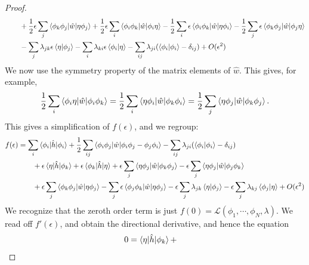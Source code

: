 \documentclass{report}
\theoremstyle{plain}
\theoremstyle{definition}
\begin{document}
\begin{proof}
\begin{equation}
\begin{split}
      & \qquad + \frac{1}{2}\epsilon
      \sum_j\braket{\phi_k\phi_j|\hat{w}|\eta\phi_j} +
      \frac{1}{2}\epsilon\sum_i
      \braket{\phi_i\phi_k|\hat{w}|\phi_i\eta} 
      - \frac{1}{2}\sum_i\epsilon\braket{\phi_i
        \phi_k|\hat{w}|\eta\phi_i}
      - \frac{1}{2}\sum_j\epsilon\braket{\phi_k
        \phi_j|\hat{w}|\phi_j\eta} \\
      & \qquad - \sum_j \lambda_{jk} \epsilon \braket{\eta|\phi_j} -
      \sum_i \lambda_{ki} \epsilon \braket{\phi_i|\eta} -
      \sum_{ij}\lambda_{ji}(\braket{\phi_i|\phi_i} - \delta_{ij}) + O(\epsilon^2)
    \end{split}
  \end{equation}
  We now use the symmetry property of the matrix elements of
  $\hat{w}$. This gives, for example,
  \begin{equation}
     \frac{1}{2} \sum_i
    \braket{\phi_i \eta|\hat{w}|\phi_i \phi_k} = 
    \frac{1}{2} \sum_i
    \braket{\eta \phi_i |\hat{w}|\phi_k \phi_i } = 
    \frac{1}{2}\sum_j
    \braket{\eta\phi_j|\hat{w}|\phi_k\phi_j}.
  \end{equation}
  This gives a simplification of $f(\epsilon)$, and we regroup:
  \begin{equation}
    \begin{split}
    f(\epsilon) &= \sum_i \braket{\phi_i|\hat{h}|\phi_i} +
      \frac{1}{2}\sum_{ij} \braket{\phi_i \phi_j|\hat{w}|\phi_i\phi_j
        - \phi_j \phi_i} -
      \sum_{ij}\lambda_{ji}(\braket{\phi_i|\phi_i} - \delta_{ij}) \\
      &\qquad +
      \epsilon\braket{\eta|\hat{h}|\phi_k} +
      \epsilon\braket{\phi_k|\hat{h}|\eta} 
      + \epsilon \sum_j
      \braket{\eta\phi_j|\hat{w}|\phi_k\phi_j} - \epsilon \sum_j
      \braket{\eta\phi_j|\hat{w}|\phi_j\phi_k} 
      \\ &\qquad + \epsilon
      \sum_j\braket{\phi_k\phi_j|\hat{w}|\eta\phi_j} -
      \sum_j\epsilon\braket{\phi_j \phi_k|\hat{w}|\eta\phi_j} 
      - \epsilon \sum_j \lambda_{jk} \braket{\eta|\phi_j} -
      \epsilon \sum_j \lambda_{kj}\braket{\phi_j|\eta} + O(\epsilon^2)
    \end{split}
  \end{equation}
  We recognize that the zeroth order term is just $f(0) =
  \mathcal{L}(\phi_1,\cdots,\phi_N,\lambda)$. We read off
  $f'(\epsilon)$, and obtain the directional derivative, and hence the
  equation
  \begin{equation}
    \begin{split}
    0 &=       \braket{\eta|\hat{h}|\phi_k} +

\end{split}
\end{equation}
\end{proof}
\end{document}
